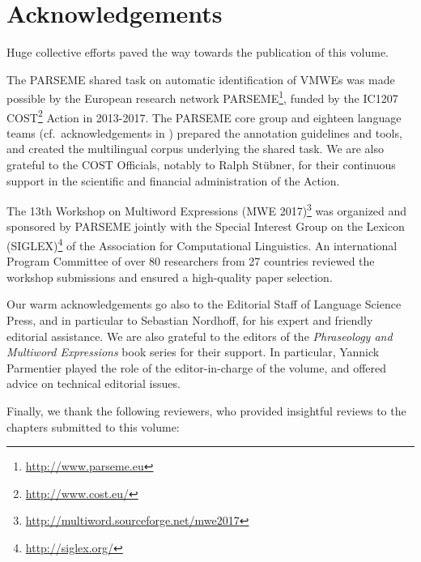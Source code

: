 \documentclass[output=paper,
modfonts,
]{langscibook}
\begin{document}




\section{Acknowledgements}
Huge collective efforts paved the way towards the publication of this volume. 

The PARSEME shared task on automatic identification of VMWEs was made possible by the European research network PARSEME\footnote{\url{http://www.parseme.eu}}, funded by the IC1207 COST\footnote{\url{http://www.cost.eu/}} Action in 2013-2017. The PARSEME core group and eighteen language teams (cf.~acknowledgements in ) prepared the annotation guidelines and tools, and created the multilingual corpus underlying the shared task. We are also grateful to the COST Officials, notably to Ralph Stübner, for their %
continuous support in the scientific and financial administration of the Action. 

The 13th Workshop on Multiword Expressions (MWE 2017)\footnote{\url{http://multiword.sourceforge.net/mwe2017}}  was organized and sponsored by PARSEME jointly with the Special Interest Group on the Lexicon (SIGLEX)\footnote{\url{http://siglex.org/}} of the Association for Computational Linguistics. An international Program Committee of over 80 researchers from 27 countries reviewed the workshop submissions and ensured a high-quality paper selection.

Our warm acknowledgements go also to the Editorial Staff of Language Science Press, and in particular to Sebastian Nordhoff, for his expert and friendly  editorial assistance. We are also grateful to the editors of the \emph{Phraseology and Multiword Expressions} book series for their support. In particular, Yannick Parmentier played the role of the editor-in-charge of the volume, and offered advice on technical editorial issues.

Finally, we thank the following reviewers, who provided insightful reviews to the chapters submitted to this volume:
\end{document}
